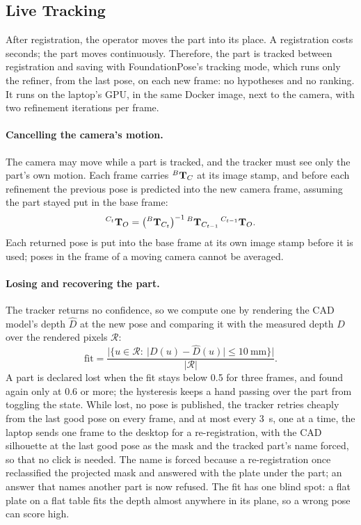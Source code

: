 \subsection{Live Tracking}
\label{sec:per_track}
After registration, the operator moves the part into its place. A registration costs seconds; the
part moves continuously. Therefore, the part is tracked between registration and saving with
FoundationPose's tracking mode, which runs only the refiner, from the last pose, on each new frame:
no hypotheses and no ranking. It runs on the laptop's GPU, in the same Docker image, next to the
camera, with two refinement iterations per frame.

\paragraph{Cancelling the camera's motion.} The camera may move while a part is tracked, and the
tracker must see only the part's own motion. Each frame carries ${}^{B}\mathbf{T}_{C}$ at its image stamp, and
before each refinement the previous pose is predicted into the new camera frame, assuming the part
stayed put in the base frame:
\begin{equation}
{}^{C_{t}}\mathbf{T}_{O} = \big({}^{B}\mathbf{T}_{C_{t}}\big)^{-1}\,{}^{B}\mathbf{T}_{C_{t-1}}\,{}^{C_{t-1}}\mathbf{T}_{O}.
\label{eq:ego_motion}
\end{equation}
Each returned pose is put into the base frame at its own image stamp before it is used; poses in the
frame of a moving camera cannot be averaged.

\paragraph{Losing and recovering the part.} The tracker returns no confidence, so we compute one by
rendering the CAD model's depth $\hat{D}$ at the new pose and comparing it with the measured depth
$D$ over the rendered pixels $\mathcal{R}$:
\begin{equation}
\mathrm{fit}=\frac{|\{u\in\mathcal{R}:\ |D(u)-\hat{D}(u)|\le10~\mathrm{mm}\}|}{|\mathcal{R}|}.
\label{eq:track_fit}
\end{equation}
A part is declared lost when the fit stays below 0.5 for three frames, and found again only at 0.6
or more; the hysteresis keeps a hand passing over the part from toggling the state. While lost, no
pose is published, the tracker retries cheaply from the last good pose on every frame, and at most
every 3~s, one at a time, the laptop sends one frame to the desktop for a re-registration, with the CAD silhouette at the
last good pose as the mask and the tracked part's name forced, so that no click is needed. The name
is forced because a re-registration once reclassified the projected mask and answered with the plate
under the part; an answer that names another part is now refused. The fit has one blind spot: a flat
plate on a flat table fits the depth almost anywhere in its plane, so a wrong pose can score high.

